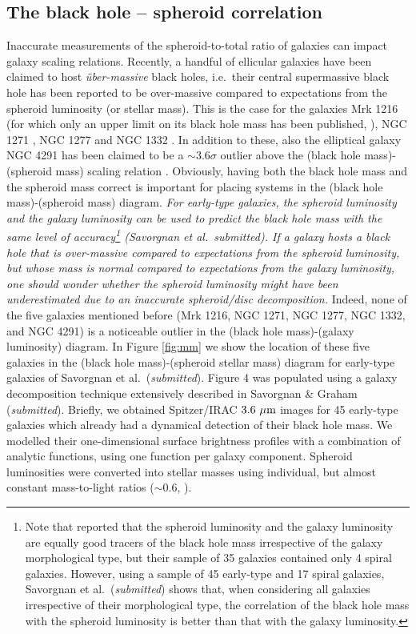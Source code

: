 \documentclass[useAMS,usenatbib,article]{mn2e}
\begin{document}
\subsection{The black hole -- spheroid correlation}
\label{sec:mm}
Inaccurate measurements of the spheroid-to-total ratio of galaxies can impact galaxy scaling relations. 
Recently, a handful of ellicular galaxies have been claimed to host \emph{{\"u}ber-massive} black holes, 
i.e.~their central supermassive black hole has been reported to be 
over-massive compared to expectations from the spheroid luminosity (or stellar mass).
This is the case for the galaxies Mrk 1216 (for which only an upper limit on its black hole mass has been published, 
\citealt{yildirim2015}), NGC 1271 \citep{walsh2015}, 
NGC 1277 \citep{vandenbosch2012,yildirim2015} and NGC 1332 \citep{rusli2011}.
In addition to these, also the elliptical galaxy NGC 4291 has been claimed to be a $\sim$$3.6\sigma$ outlier 
above the (black hole mass)-(spheroid mass) scaling relation \citep{bogdan2012}. 
Obviously, having both the black hole mass and the spheroid mass correct is important 
for placing systems in the (black hole mass)-(spheroid mass) diagram. 
\emph{For early-type galaxies, the spheroid luminosity and the galaxy luminosity 
can be used to predict the black hole mass with the same level of accuracy\footnote{Note that 
\cite{lasker2014anal} reported that the spheroid luminosity and the galaxy luminosity are equally good tracers of the black hole mass 
irrespective of the galaxy morphological type, but their sample of 35 galaxies contained only 4 spiral galaxies. 
However, using a sample of 45 early-type and 17 spiral galaxies, 
Savorgnan et al.~(\emph{submitted}) shows that, when considering all galaxies irrespective of their morphological type, 
the correlation of the black hole mass with the spheroid luminosity is better than that with the galaxy luminosity.} 
(Savorgnan et al.~submitted). 
If a galaxy hosts a black hole that is over-massive compared to expectations from the spheroid luminosity, 
but whose mass is normal compared to expectations from the galaxy luminosity, 
one should wonder whether the spheroid luminosity might have been underestimated 
due to an inaccurate spheroid/disc decomposition. }
Indeed, none of the five galaxies mentioned before (Mrk 1216, NGC 1271, NGC 1277, NGC 1332, and NGC 4291) is a noticeable outlier 
in the (black hole mass)-(galaxy luminosity) diagram. 
In Figure \ref{fig:mm} we show the location of these five galaxies in the (black hole mass)-(spheroid stellar mass) diagram 
for early-type galaxies of Savorgnan et al.~(\emph{submitted}). 
Figure 4 was populated using a galaxy decomposition technique extensively described in Savorgnan \& Graham (\emph{submitted}). 
Briefly, we obtained Spitzer/IRAC $3.6~\rm \mu m$ images for 45 early-type galaxies 
which already had a dynamical detection of their black hole mass. 
We modelled their one-dimensional surface brightness profiles with a combination of analytic functions, using one function per galaxy component. 
Spheroid luminosities were converted into stellar masses using individual, but almost constant mass-to-light ratios ($\sim$$0.6$, \citealt{meidt2014-MNRAS}). 
\end{document}

